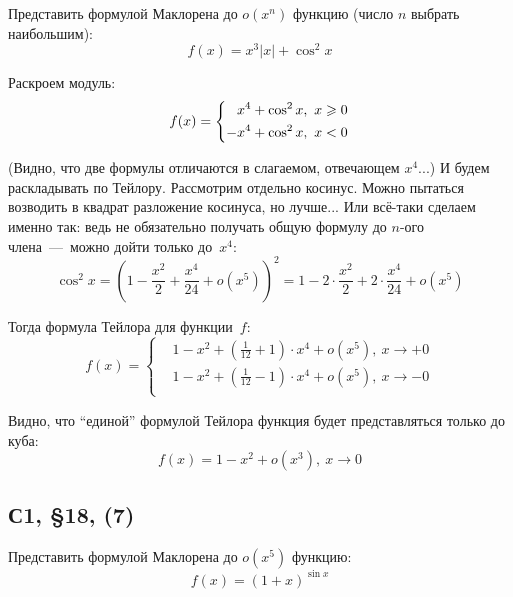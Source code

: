 \documentclass[a4paper,12pt]{article}
\begin{document}
  Представить формулой Маклорена до $o(x^n)$ функцию (число $n$ выбрать наибольшим):
  \[
    f(x) = x^3 |x| + \cos^2 x
  \]
  
  \begin{solution}
    Раскроем модуль:
    \[
      f(x) = \left\{
        \begin{aligned}
          &\hphantom{+}x^4 + \cos^2 x,\ x \geq 0\\
          &{-}x^4 + \cos^2 x,\ x < 0
        \end{aligned}
      \right.
    \]
    
    (Видно, что две формулы отличаются в слагаемом, отвечающем $x^4$...)
    И будем раскладывать по Тейлору.
    Рассмотрим отдельно косинус.
    Можно пытаться возводить в квадрат разложение косинуса, но лучше...
    Или всё-таки сделаем именно так: ведь не обязательно получать общую формулу до $n$-ого члена~---~можно дойти только до~$x^4$:
    \[
      \cos^2 x = \left(1 - \frac{x^2}{2} + \frac{x^4}{24} + o(x^5)\right)^2
        = 1 - 2 \cdot \frac{x^2}{2} + 2 \cdot \frac{x^4}{24} + o(x^5)
    \]
    
    Тогда формула Тейлора для функции~$f$:
    \[
      f(x) = \left\{
        \begin{aligned}
          &1 - x^2 + \left(\frac{1}{12} + 1\right) \cdot x^4 + o(x^5),\ x \to +0\\
          &1 - x^2 + \left(\frac{1}{12} - 1\right) \cdot x^4 + o(x^5),\ x \to -0\\
        \end{aligned}
      \right.
    \]
    
    Видно, что ``единой'' формулой Тейлора функция будет представляться только до куба:
    \[
      f(x) = 1 - x^2 + o(x^3),\ x \to 0
    \]
  \end{solution}
  
  
  
  
  
  \subsection{С1, \S 18, (7)}
  
  Представить формулой Маклорена до $o(x^5)$ функцию:
  \[
    f(x) = (1 + x)^{\sin x}
  \]
  
\end{document}
